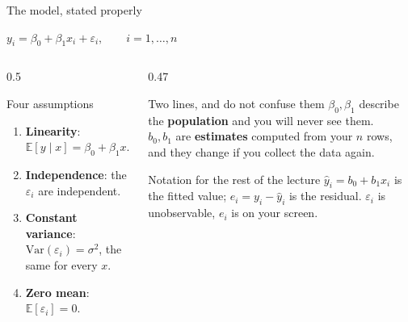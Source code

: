 \documentclass[aspectratio=169]{beamer}
\begin{document}
\begin{frame}[shrink=6]{The model, stated properly}
  \begin{exampleblock}{}
    \centering\large
    $y_i = \beta_0 + \beta_1 x_i + \varepsilon_i, \qquad i = 1,\dots,n$
  \end{exampleblock}
  \vspace{0.2em}
  \begin{columns}[T]
    \begin{column}{0.5\textwidth}
      \begin{block}{Four assumptions}
        \small
        \begin{enumerate}
          \item \textbf{Linearity}: $\mathbb{E}[y \mid x] = \beta_0 +
            \beta_1 x$.
          \item \textbf{Independence}: the $\varepsilon_i$ are independent.
          \item \textbf{Constant variance}: $\mathrm{Var}(\varepsilon_i) =
            \sigma^2$, the same for every $x$.
          \item \textbf{Zero mean}: $\mathbb{E}[\varepsilon_i] = 0$.
        \end{enumerate}
      \end{block}
    \end{column}
    \begin{column}{0.47\textwidth}
      \begin{alertblock}{Two lines, and do not confuse them}
        \small $\beta_0, \beta_1$ describe the \textbf{population} and you
        will never see them.\\[0.25em]
        $b_0, b_1$ are \textbf{estimates} computed from your $n$ rows, and
        they change if you collect the data again.
      \end{alertblock}
      \begin{block}{Notation for the rest of the lecture}
        \small $\hat y_i = b_0 + b_1 x_i$ is the fitted value;
        $e_i = y_i - \hat y_i$ is the residual. $\varepsilon_i$ is
        unobservable, $e_i$ is on your screen.
      \end{block}
    \end{column}
  \end{columns}
\end{frame}
\end{document}
